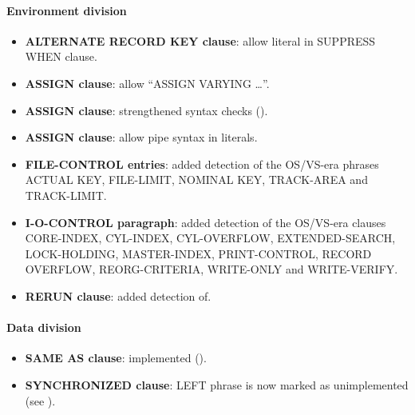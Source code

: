 \paragraph{Environment division}
\begin{itemize}
\item \textbf{ALTERNATE RECORD KEY clause}: allow literal in SUPPRESS WHEN clause.
\item \textbf{ASSIGN clause}: allow ``ASSIGN VARYING \ldots''.
\item \textbf{ASSIGN clause}: strengthened syntax checks ().
\item \textbf{ASSIGN clause}: allow pipe syntax in literals.
\item \textbf{FILE-CONTROL entries}: added detection of the OS\slash{}VS-era phrases ACTUAL KEY, FILE-LIMIT, NOMINAL KEY, TRACK-AREA and TRACK-LIMIT.
\item \textbf{I-O-CONTROL paragraph}: added detection of the OS\slash{}VS-era clauses CORE-INDEX, CYL-INDEX, CYL-OVERFLOW, EXTENDED-SEARCH, LOCK-HOLDING, MASTER-INDEX, PRINT-CONTROL, RECORD OVERFLOW, REORG-CRITERIA, WRITE-ONLY and WRITE-VERIFY.
\item \textbf{RERUN clause}: added detection of.
\end{itemize}

\paragraph{Data division}
\begin{itemize}
\item \textbf{SAME AS clause}: implemented ().
\item \textbf{SYNCHRONIZED clause}: LEFT phrase is now marked as unimplemented (see ).
\end{itemize}

